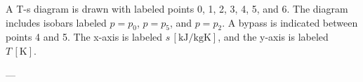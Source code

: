 A T-s diagram is drawn with labeled points 0, 1, 2, 3, 4, 5, and 6. The diagram includes isobars labeled \( p = p_0 \), \( p = p_5 \), and \( p = p_2 \). A bypass is indicated between points 4 and 5. The x-axis is labeled \( s \, [\text{kJ/kgK}] \), and the y-axis is labeled \( T \, [\text{K}] \).

---